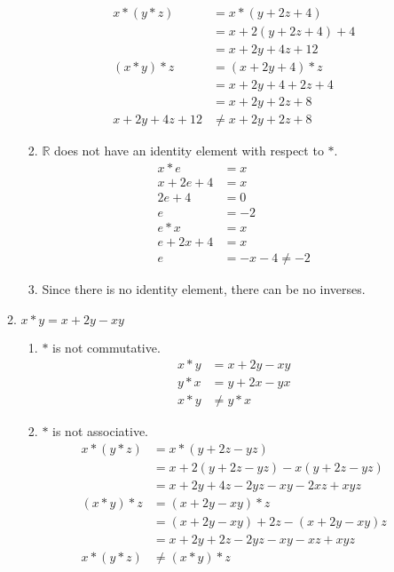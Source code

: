 \begin{enumerate}[label={\Alph*.},font={\bfseries}]
\begin{enumerate}[label={\arabic*},font={\bfseries}]
\begin{enumerate}[label={(\roman*)}]
\begin{align*}
              x*(y*z) &= x*(y+2z+4) \\
              &= x+2(y+2z+4)+4 \\
              &= x+2y+4z+12 \\
              (x*y)*z &= (x+2y+4)*z \\
              &= x+2y+4+2z+4 \\
              &= x+2y+2z+8 \\
              x+2y+4z+12 &\neq x+2y+2z+8
            \end{align*}
          \item $\mathbb{R}$ does not have an identity element with respect to $*$.
            \begin{align*}
              x*e &= x \\
              x+2e+4 &= x \\
              2e+4 &= 0 \\
              e &= -2 \\
              e*x &= x \\
              e+2x+4 &= x \\
              e &= -x-4 \neq -2
            \end{align*}
          \item Since there is no identity element, there can be no inverses.
        \end{enumerate}
      \item $x*y=x+2y-xy$
        \begin{enumerate}[label={(\roman*)}]
          \item $*$ is not commutative.
            \begin{align*}
              x*y &= x+2y-xy \\
              y*x &= y+2x-yx \\
              x*y &\neq y*x
            \end{align*}
          \item $*$ is not associative.
            \begin{align*}
              x*(y*z) &= x*(y+2z-yz) \\
              &= x+2(y+2z-yz)-x(y+2z-yz) \\
              &= x+2y+4z-2yz-xy-2xz+xyz \\
              (x*y)*z &= (x+2y-xy)*z \\
              &=(x+2y-xy)+2z-(x+2y-xy)z \\
              &=x+2y+2z-2yz-xy-xz+xyz \\
              x*(y*z) &\neq (x*y)*z

\end{align*}
\end{enumerate}
\end{enumerate}
\end{enumerate}
